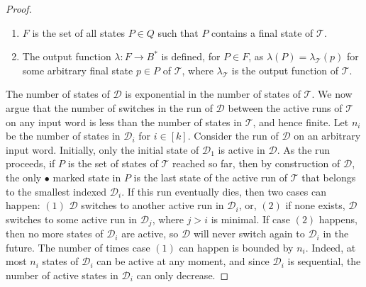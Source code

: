 \documentclass[a4paper,UKenglish,cleveref, autoref, thm-restate,authorcolumns, colorlinks]{lipics-v2021}
\newcommand\calD{\mathcal{D}}
\newcommand\calT{\mathcal{T}}
\begin{document}
{\begin{proof}
\begin{enumerate}
\begin{enumerate}
            \item If no transition exists from $p$ on $a$ within $\calD_i$, but a transition $(p,a,q,x_{pq})$ in $\calT$ exists to a different sequential transducer, i.e., $q$ belongs to $\calD_{i+1}$, then $x=x_{pq}$ and $q$ is $\bullet$ marked in $S$. Such a transition is called a \emph{switch} (to $\calD_{i+1}$).
            \item Otherwise, choose the smallest numbered state $p' \in P$ that belongs to the smallest indexed sequential transducer 
            $\calD_j$ where $j \in [k]$ with a defined transition $(p',a,q',x_{p'q'})$  in $\calT$, and set $x = x_{p'q'}$ and $\bullet$ mark $q'$  in $S$. Such a transition is also called a switch (to $\calD_j$). 
        \end{enumerate}
        \item $F$ is the set of all states $P \in Q$ such that $P$ contains a final state of $\calT$.
        \item The output function $\lambda: F \rightarrow B^*$ is defined, for $P \in F$, as $\lambda(P)=\lambda_\calT(p)$ for some arbitrary final state $p\in P$ of $\calT$, where $\lambda_\calT$ is the output function of $\calT$.
    \end{enumerate}
     The number of states of $\calD$ is exponential in the number of states of $\calT$. We now argue that the number of switches in the run of $\calD$ between the active runs of $\calT$ on any input word is less than the number of states in $\calT$, and hence finite. 
     Let $n_i$ be the number of states in $\calD_i$ for $i \in [k]$. Consider the run of $\calD$ on an arbitrary input word. Initially, only the initial state of $\calD_1$ is active in $\calD$.  
     As the run proceeds, if $P$ is the set of states of $\calT$ reached so far, then by construction of $\calD$, the only $\bullet$ marked state in $P$ is the last state of the active run of $\calT$ that belongs to the smallest indexed $\calD_i$. If this run eventually dies, then two cases can happen: $(1)$ $\calD$ switches to another active run in $\calD_i$, or, $(2)$ if none exists, $\calD$ switches to some active run in $\calD_j$, where $j>i$ is minimal. 
     If case $(2)$ happens, then no more states of $\calD_i$ are active, so $\calD$ will never switch again to $\calD_i$ in the future. The number of times case $(1)$ can happen is bounded by $n_i$. Indeed, at most $n_i$ states of $\calD_i$ can be active at any moment, and since $\calD_i$ is sequential, the number of active states in $\calD_i$ can only decrease.
     

\end{proof}}
\end{document}
